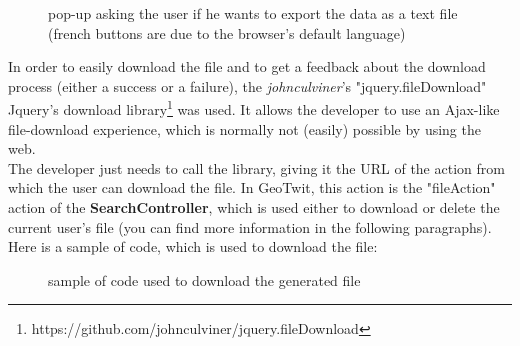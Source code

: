 \documentclass[a4paper,11pt]{report}
\begin{document}
\begin{figure}[H]
\vspace{-5pt}
\begin{center}
\vspace{-5pt}
\caption{pop-up asking the user if he wants to export the data as a text file (french buttons are due to the browser's default language)}
\end{center}
\end{figure}

In order to easily download the file and to get a feedback about the download process (either a success or a failure), the \emph{johnculviner}'s "jquery.fileDownload" Jquery's download library\footnote{https://github.com/johnculviner/jquery.fileDownload} was used. It allows the developer to use an Ajax-like file-download experience, which is normally not (easily) possible by using the web.\\
The developer just needs to call the library, giving it the URL of the action from which the user can download the file. In GeoTwit, this action is the "fileAction" action of the \textbf{SearchController}, which is used either to download or delete the current user's file (you can find more information in the following paragraphs). Here is a sample of code, which is used to download the file:
\begin{figure}[H]
\vspace{-5pt}
\begin{center}
\vspace{-5pt}
\caption{sample of code used to download the generated file}
\end{center}
\end{figure}
\end{document}
